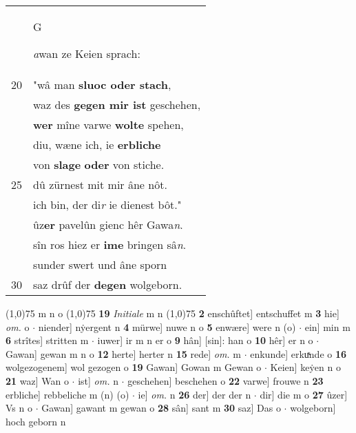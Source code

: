 \documentclass[8pt,a4paper,notitlepage]{article}
\begin{document}
\begin{table}[ht]
\begin{minipage}[t]{0.5\linewidth}
\begin{tabular}{rl}
 & \begin{large}G\end{large}\textit{a}wan ze Keien sprach:\\ 
20 & "wâ man \textbf{sluoc oder stach},\\ 
 & waz des \textbf{gegen mir ist} geschehen,\\ 
 & \textbf{wer} mîne varwe \textbf{wolte} spehen,\\ 
 & diu, wæne ich, ie \textbf{erbliche}\\ 
 & von \textbf{slage} \textbf{oder} von stiche.\\ 
25 & dû zürnest mit mir âne nôt.\\ 
 & ich bin, der di\textit{r} ie dienest bôt."\\ 
 & ûz\textbf{er} pavelûn gienc hêr Gawa\textit{n}.\\ 
 & sîn ros hiez er \textbf{ime} bringen sâ\textit{n}.\\ 
 & sunder swert und âne sporn\\ 
30 & saz drûf der \textbf{degen} wolgeborn.\\ 
\end{tabular}
\scriptsize
\line(1,0){75} \newline
m n o \newline
\line(1,0){75} \newline
\textbf{19} \textit{Initiale} m n  \newline
\line(1,0){75} \newline
\textbf{2} enschûftet] entschuffet m \textbf{3} hie] \textit{om.} o  $\cdot$ niender] nẏergent n \textbf{4} mürwe] nuwe n o \textbf{5} enwære] were n (o)  $\cdot$ ein] min m \textbf{6} strîtes] stritten m  $\cdot$ iuwer] ir m n er o \textbf{9} hân] [sin]: han o \textbf{10} hêr] er n o  $\cdot$ Gawan] gewan m n o \textbf{12} herte] herter n \textbf{15} rede] \textit{om.} m  $\cdot$ enkunde] erkuͯnde o \textbf{16} wolgezogenem] wol gezogen o \textbf{19} Gawan] Gowan m Gewan o  $\cdot$ Keien] keẏen n o \textbf{21} waz] Wan o  $\cdot$ ist] \textit{om.} n  $\cdot$ geschehen] beschehen o \textbf{22} varwe] frouwe n \textbf{23} erbliche] rebbeliche m (n) (o)  $\cdot$ ie] \textit{om.} n \textbf{26} der] der der n  $\cdot$ dir] die m o \textbf{27} ûzer] Vs n o  $\cdot$ Gawan] gawant m gewan o \textbf{28} sân] sant m \textbf{30} saz] Das o  $\cdot$ wolgeborn] hoch geborn n \newline
\end{minipage}
\end{table}
\newpage
\end{document}

